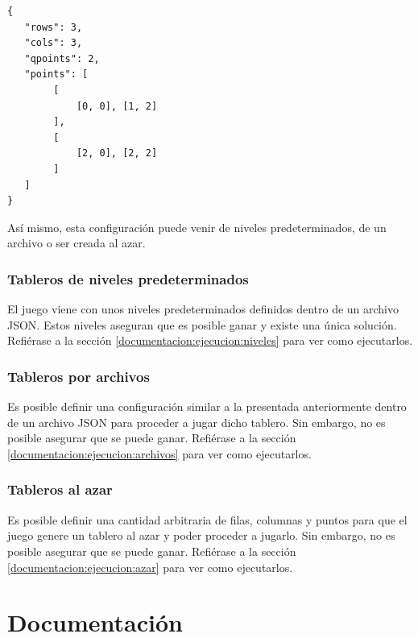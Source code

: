 \documentclass[letter,12pt]{article}
\begin{document}
\begin{verbatim}
{
   "rows": 3,
   "cols": 3,
   "qpoints": 2,
   "points": [
        [
            [0, 0], [1, 2]
        ],
        [
            [2, 0], [2, 2]
        ]
   ]
}
\end{verbatim}

Así mismo, esta configuración puede venir de niveles predeterminados, de un archivo o ser creada al azar. \par

\subsubsection{Tableros de niveles predeterminados} \label{implementacion:configuracion:niveles}

El juego viene con unos niveles predeterminados definidos dentro de un archivo JSON. Estos niveles aseguran que es posible ganar y existe una única solución. Refiérase a la sección \ref{documentacion:ejecucion:niveles} para ver como ejecutarlos. \par

\subsubsection{Tableros por archivos} \label{implementacion:configuracion:archivos}

Es posible definir una configuración similar a la presentada anteriormente dentro de un archivo JSON para proceder a jugar dicho tablero. Sin embargo, no es posible asegurar que se puede ganar. Refiérase a la sección \ref{documentacion:ejecucion:archivos} para ver como ejecutarlos. \par

\subsubsection{Tableros al azar} \label{implementacion:configuracion:azar}

Es posible definir una cantidad arbitraria de filas, columnas y puntos para que el juego genere un tablero al azar y poder proceder a jugarlo. Sin embargo, no es posible asegurar que se puede ganar. Refiérase a la sección \ref{documentacion:ejecucion:azar} para ver como ejecutarlos. \par

\section{Documentación} \label{documentacion}
\end{document}

